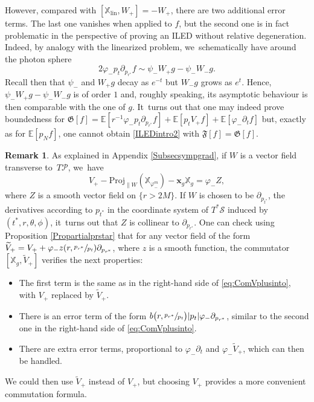 \documentclass[10pt]{amsart}
\theoremstyle{plain}
\theoremstyle{definition}
\newtheorem{remark}[proposition]{Remark}
\newcommand\T{{\mathbb{X}}}
\begin{document}
However, compared with $[\T_{\mathrm{lin}},W_+]=-W_+$, there are two additional error terms. The last one vanishes when applied to $f$, but the second one is in fact problematic in the perspective of proving an ILED without relative degeneration. Indeed, by analogy with the linearized problem, we~schematically have around the photon sphere\vspace*{-3pt}
\begin{equation}\label{eq:heuri}
2\varphi_- p_t \partial_{p_{r^*}} f \sim \psi_- W_+g- \psi_- W_-g.
\end{equation}
Recall then that $\psi_-$ and $W_+ g$ decay as $e^{-t}$ but $W_- g$ grows as $e^t$. Hence, $ \psi_- W_+g- \psi_- W_-g $ is of order $1$ and, roughly speaking, its asymptotic behaviour is then comparable with the one of $g$. It~turns out that one may indeed prove boundedness for $\mathfrak{G}[f]=\mathbb{E} [ r^{-1}\varphi_- p_t \partial_{p_{r^*}} f ]+\mathbb{E} [ p_t V_+ f ]+\mathbb{E}[\varphi_- \partial_t f]$ but, exactly as for $\mathbb{E}[p_N f]$, one cannot obtain \eqref{ILEDintro2} with $\mathfrak{F}[f]=\mathfrak{G}[f]$.

\begin{remark}\label{Rqproj}
As explained in Appendix \ref{Subsecsympgrad}, if $W$ is a vector field transverse to~$T \mathcal{P}$, we~have\vspace*{-5pt}
\[
V_+-\mathrm{Proj}_{\parallel W}(\T_{\varphi_-^m})-\pmb{x}_g \T_g=\varphi_- Z,
\]
where $Z$ is a smooth vector field on $\{ r>2M\}$. If $W$ is chosen to be $\partial_{p_{t^*}}$, the derivatives according to $p_{t^*}$ in the coordinate system of $T^* \mathcal{S}$ induced by $(t^*,r,\theta,\phi)$, it~turns out that $Z$ is collinear to $\partial_{p_{r^*}}$. One can check using Proposition \ref{Propartialprstar} that for any vector field of the form $\widetilde{V}_+=V_++\varphi_- z(r,\sfrac{p_{r^*}}{p_t}) \partial_{p_{r^*}}$, where $z$ is a smooth function, the commutator $[\T_g,\widetilde{V}_+]$ verifies the next properties:
\begin{itemize}
\item The first term is the same as in the right-hand side of \eqref{eq:ComVplusinto}, with $V_+$ replaced by $\widetilde{V}_+$.
\item There is an error term of the form $b\bigl(r,\sfrac{p_{r^*}}{p_t} \bigr)|p_t|\varphi_- \partial_{p_{r^*}}$, similar to the second one in the right-hand side of \eqref{eq:ComVplusinto}.
\item There are extra error terms, proportional to $\varphi_- \partial_t$ and $\varphi_- \widetilde{V}_+$, which can then be handled.
\end{itemize}
We could then use $\widetilde{V}_+$ instead of $V_+$, but choosing $V_+$ provides a more convenient commutation formula.
\end{remark}
\end{document}
